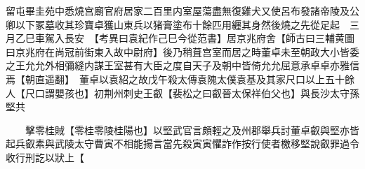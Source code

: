 留屯畢圭苑中悉燒宫廟官府居家二百里内室屋蕩盡無復雞犬又使呂布發諸帝陵及公卿以下冢墓收其珍寶卓獲山東兵以猪膏塗布十餘匹用纒其身然後燒之先從足起　三月乙巳車駕入長安　【考異曰袁紀作己巳今從范書】居京兆府舍【師古曰三輔黄圖曰京兆府在尚冠前街東入故中尉府】後乃稍葺宫室而居之時董卓未至朝政大小皆委之王允允外相彌縫内謀王室甚有大臣之度自天子及朝中皆倚允允屈意承卓卓亦雅信焉【朝直遥翻】　董卓以袁紹之故戊午殺太傳袁隗太僕袁基及其家尺口以上五十餘人【尺口謂嬰孩也】初荆州刺史王叡【裴松之曰叡晉太保祥伯父也】與長沙太守孫堅共

　　擊零桂賊【零桂零陵桂陽也】以堅武官言頗輕之及州郡舉兵討董卓叡與堅亦皆起兵叡素與武陵太守曹寅不相能揚言當先殺寅寅懼詐作按行使者檄移堅說叡罪過令收行刑訖以狀上【